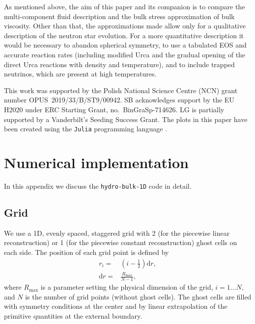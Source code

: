\documentclass[aps,prd,twocolumn,a4paper,floatfix,nofootbib,superscriptaddress,nofootinbib]{revtex4}
\begin{document}
As mentioned above, the aim of this paper and its companion \cite{Camelio22a}
is to compare the multi-component fluid description and the bulk stress
approximation of bulk viscosity.  Other than that, the approximations made
allow only for a qualitative description of the neutron star evolution.  For a
more quantitative description it would be necessary to abandon spherical
symmetry, to use a tabulated EOS and accurate reaction rates (including
modified Urca and the gradual opening of the direct Urca reactions with density
and temperature), and to include trapped neutrinos, which are present at high
temperatures.

\begin{acknowledgments}
This work was supported by the Polish National Science Centre (NCN) grant number OPUS~2019/33/B/ST9/00942.
SB acknowledges support by the EU H2020 under ERC Starting Grant, no.~BinGraSp-714626.
LG is partially supported by a Vanderbilt's Seeding Success Grant.
The plots in this paper have been created using the \texttt{Julia} programming language \cite{bezanson2017julia}.
\end{acknowledgments}




\appendix

\section{Numerical implementation}
\label{sec:implementation}

In this appendix we discuss the \texttt{hydro-bulk-1D} code \citep{Camelio22code} in detail.

\subsection{Grid}
\label{ssec:grid}

We use a 1D, evenly spaced, staggered grid with 2 (for the piecewise linear
reconstruction) or 1 (for the piecewise constant reconstruction) ghost cells on
each side.  The position of each grid point is defined by
%
\begin{align}
r_i={}&\left(i-\frac12\right)\mathrm dr,\\
\mathrm dr={}&\frac{R_\mathrm{max}}{N-1},
\end{align}
%
where $R_\mathrm{max}$ is a parameter setting the physical dimension of the
grid, $i=1\ldots N$, and $N$ is the number of grid points (without ghost
cells).  The ghost cells are filled with symmetry conditions at the center and
by linear extrapolation of the primitive quantities at the external boundary.
\end{document}
